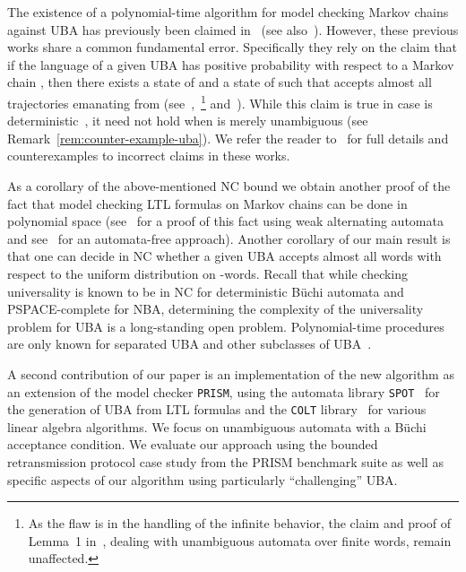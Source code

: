 \documentclass{elsarticle}
\newcommand{\prism}{\texttt{PRISM}}
\newcommand{\colt}{\texttt{COLT}}
\newcommand{\spot}{\texttt{SPOT}}
\begin{document}
The existence of a polynomial-time algorithm for model checking Markov
chains against UBA has previously been claimed
in~\cite{BenLenWor13,BenLenWor14,LenhardtThesis13} (see
also~\cite{Len-Tulip13}).  However, these previous works share a
common fundamental error.  Specifically they rely on the claim that if
the language of a given UBA  has positive probability with
respect to a Markov chain , then there exists a state  of
 and a state  of  such that  accepts almost all
trajectories emanating from  (see~\cite[Lemma
7.1]{BenLenWor13},~\cite[Theorem 2]{BenLenWor14}\footnote{As the flaw is in the handling of the infinite behavior, the
  claim and proof of Lemma~1 in~\cite{BenLenWor14}, dealing with
  unambiguous automata over finite words, remain unaffected.  }
and~\cite[Section 3.3.1]{LenhardtThesis13}).  While this claim is true
in case  is deterministic~\cite{CY95}, it need not hold when
 is merely unambiguous (see
Remark~\ref{rem:counter-example-uba}).  We refer the reader
to~\cite{BKKKMW16} for full details and counterexamples to incorrect
claims in these works.

As a corollary of the above-mentioned NC bound we obtain another proof
of the fact that model checking LTL formulas on Markov chains can be
done in polynomial space (see~\cite{BusRubVar04} for a proof of this
fact using weak alternating automata and see~\cite{CY88,CY95} for an
automata-free approach).  Another corollary of our main result is that
one can decide in NC whether a given UBA accepts almost all words with
respect to the uniform distribution on -words.  Recall that
while checking universality is known to be in NC for
deterministic B\"uchi automata and PSPACE-complete for NBA,
determining the complexity of the universality problem for UBA is a
long-standing open problem.  Polynomial-time procedures are only known
for separated UBA and other subclasses of
UBA~\cite{BousLoed10,IsaLoed12}.



A second contribution of our paper is an implementation of the new
algorithm as an extension of the model checker \prism{}, using the
automata library \spot{}~\cite{Duret13} for the generation of UBA from
LTL formulas and the \colt{} library~\cite{Hoschek04} for various
linear algebra algorithms.
We focus on unambiguous automata with a B\"uchi acceptance condition.
We evaluate our approach using the bounded
retransmission protocol case study from the PRISM benchmark suite
\cite{prismBenchmark} as well as specific aspects of our algorithm
using particularly ``challenging'' UBA.
\end{document}
